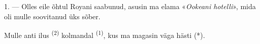 %
%
%
%
%
%


\VUsaut{3.0mm}
\VUsaut{1.6mm}
\VUsaut{2.0mm}
\VUsaut{3.4mm}

1. --- Olles eile õhtul Royani saabunud, asusin ma elama «\textit{Ookeani hotelli}»,
mida oli mulle soovitanud üks sõber.

Mulle anti ilus  \textsuperscript{(2)} kolmandal 
\textsuperscript{(1)}, kus ma magasin väga hästi (*).

